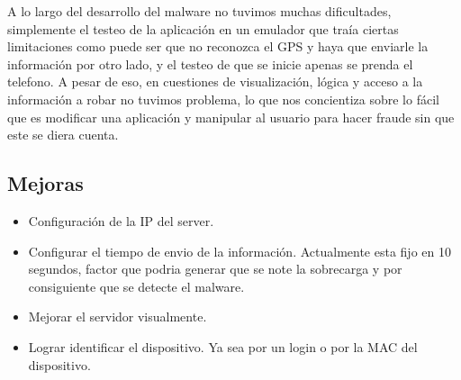 A lo largo del desarrollo del malware no tuvimos muchas dificultades, simplemente el testeo de la aplicaci\'on en un emulador que tra\'ia ciertas limitaciones como puede ser que no reconozca el GPS y haya que enviarle la información por otro lado, y el testeo de que se inicie apenas se prenda el telefono. A pesar de eso, en cuestiones de visualización, l\'ogica y acceso a la información a robar no tuvimos problema, lo que nos concientiza sobre lo f\'acil que es modificar una aplicaci\'on y manipular al usuario para hacer fraude sin que este se diera cuenta. 

\subsection{Mejoras}

\begin{itemize}
\item Configuración de la IP del server. 
\item Configurar el tiempo de envio de la información. Actualmente esta fijo en 10 segundos, factor que podria generar que se note la sobrecarga y por consiguiente que se detecte el malware.
\item Mejorar el servidor visualmente.
\item Lograr identificar el dispositivo. Ya sea por un login o por la MAC del dispositivo.
\end{itemize}